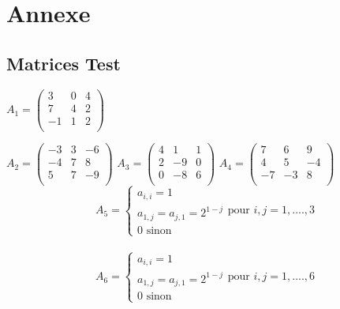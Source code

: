 \chapter*{Annexe}
\label{annexe}
\section*{Matrices Test}
$A_1 = \begin{pmatrix}
    3&0&4\\
    7&4&2\\
    -1&1&2\\
    \end{pmatrix}
    $
    
    $A_2 = \begin{pmatrix}
    -3&3&-6\\
    -4&7&8\\
    5&7&-9\\
    \end{pmatrix}
    $
    $A_3 = \begin{pmatrix}
    4&1&1\\
    2&-9&0\\
    0&-8&6\\
    \end{pmatrix}
    $
    $A_4 = \begin{pmatrix}
    7&6&9\\
    4&5&-4\\
    -7&-3&8\\
    \end{pmatrix}
    $\vspace{6pt}\\
    \begin{equation*}
        A_5=
        \begin{cases}
            a_{i,i}=1 \\
            a_{1,j}=a_{j,1}=2^{1-j}\\
            0 \text{ sinon}
        \end{cases} \text{pour }i,j=1,....,3
    \end{equation*}
    \\
    \begin{equation*}
        A_6=
        \begin{cases}
            a_{i,i}=1 \\
            a_{1,j}=a_{j,1}=2^{1-j}\\
            0 \text{ sinon}
        \end{cases} \text{pour }i,j=1,....,6
    \end{equation*}
